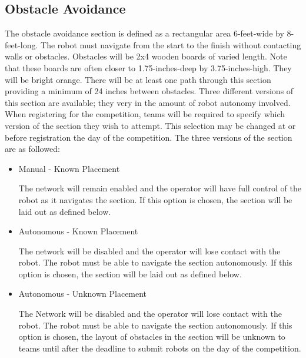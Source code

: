 \subsection{Obstacle Avoidance}
The obstacle avoidance section is defined as a rectangular area 6-feet-wide by 8-feet-long. The robot must navigate from the start to the finish without contacting walls or obstacles. Obstacles will be 2x4 wooden boards of varied length. Note that these boards are often closer to 1.75-inches-deep by 3.75-inches-high. They will be bright orange. There will be at least one path through this section providing a minimum of 24 inches between obstacles. Three different versions of this section are available; they very in the amount of robot autonomy involved. When registering for the competition, teams will be required to specify which version of the section they wish to attempt. This selection may be changed at or before registration the day of the competition. The three versions of the section are as followed:

\begin{itemize}
    \item Manual - Known Placement
    
        The network will remain enabled and the operator will have full control of the robot as it navigates the section. If this option is chosen, the section will be laid out as defined below.
    \item Autonomous - Known Placement
    
        The network will be disabled and the operator will lose contact with the robot. The robot must be able to navigate the section autonomously. If this option is chosen, the section will be laid out as defined below.
    \item Autonomous - Unknown Placement
    
        The Network will be disabled and the operator will lose contact with the robot. The robot must be able to navigate the section autonomously. If this option is chosen, the layout of obstacles in the section will be unknown to teams until after the deadline to submit robots on the day of the competition. 
        
\end{itemize}